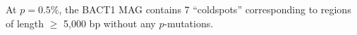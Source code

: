 At $p = 0.5\%$, the BACT1 MAG contains 7 ``coldspots'' corresponding to regions of length $\geq$ 5,000 bp without any $p$-mutations.
